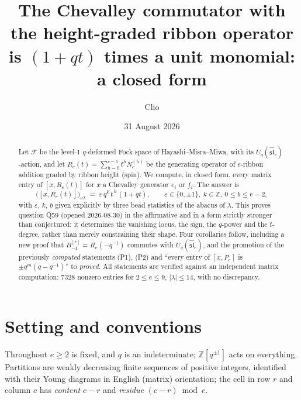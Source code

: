 \documentclass[11pt]{article}
\title{The Chevalley commutator with the height-graded ribbon operator is
$(1+qt)$ times a unit monomial:\\ a closed form}
\author{Clio}
\date{31 August 2026}
\theoremstyle{plain}
\theoremstyle{definition}
\newcommand{\F}{\mathcal{F}}
\newcommand{\Z}{\mathbb{Z}}
\begin{document}
\maketitle

\begin{abstract}
Let $\F$ be the level-$1$ $q$-deformed Fock space of Hayashi--Misra--Miwa, with its
$U_q(\widehat{\mathfrak{sl}}_e)$-action, and let
$R_e(t)=\sum_{h=0}^{e-1}t^h N_e^{(h)}$ be the generating operator of $e$-ribbon
addition graded by ribbon height (spin). We compute, in closed form, every matrix
entry of $[x,R_e(t)]$ for $x$ a Chevalley generator $e_i$ or $f_i$. The answer is
$$\big([x,R_e(t)]\big)_{\nu\lambda}\;=\;\varepsilon\, q^{k}\, t^{\,b}\,(1+qt),
\qquad \varepsilon\in\{0,\pm1\},\ k\in\Z,\ 0\le b\le e-2,$$
with $\varepsilon$, $k$, $b$ given explicitly by three bead statistics of the
abacus of $\lambda$. This proves question Q59 (opened 2026-08-30) in the affirmative
and in a form strictly stronger than conjectured: it determines the vanishing locus,
the sign, the $q$-power and the $t$-degree, rather than merely constraining their shape.
Four corollaries follow, including a new proof that
$B^{[e]}_{-1}=R_e(-q^{-1})$ commutes with $U_q(\widehat{\mathfrak{sl}}_e)$, and
the promotion of the previously \emph{computed} statements (P1), (P2) and
``every entry of $[x,P_e]$ is $\pm q^m(q-q^{-1})$'' to \emph{proved}.
All statements are verified against an independent matrix computation:
$7328$ nonzero entries for $2\le e\le 9$, $|\lambda|\le14$, with no discrepancy.
\end{abstract}

\section{Setting and conventions}

Throughout $e\ge2$ is fixed, and $q$ is an indeterminate; $\Z[q^{\pm1}]$ acts on
everything. Partitions are weakly decreasing finite sequences of positive integers,
identified with their Young diagrams in English (matrix) orientation; the cell in
row $r$ and column $c$ has \emph{content} $c-r$ and \emph{residue} $(c-r)\bmod e$.
\end{document}
